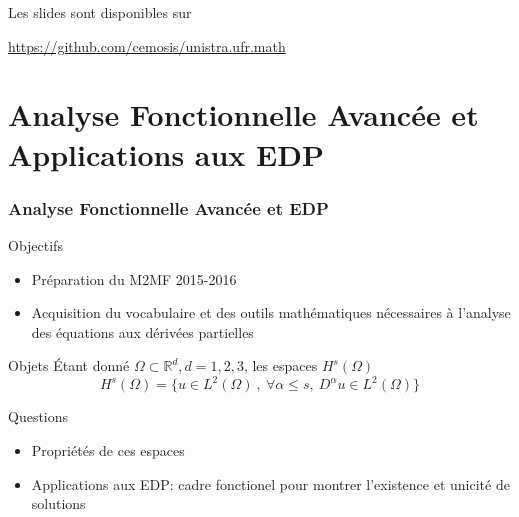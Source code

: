 \documentclass{beamer}
\begin{document}
\begin{frame}
  Les slides sont disponibles sur
  \begin{center}
    \centerline{\url{https://github.com/cemosis/unistra.ufr.math}}
  \end{center}
\end{frame}

\section{Analyse Fonctionnelle Avanc{\'e}e et Applications aux EDP}

\begin{frame}\frametitle{Analyse Fonctionnelle Avancée et  EDP}
  \begin{block}{Objectifs}
    \begin{itemize}
    \item Pr{\'e}paration du M2MF 2015-2016
    \item Acquisition du vocabulaire et des outils math{\'e}matiques n{\'e}cessaires {\`a}
      l'analyse des {\'e}quations aux d{\'e}riv{\'e}es partielles
    \end{itemize}
  \end{block}
  \begin{block}{Objets}
    {\'E}tant donn{\'e} $\Omega \subset \mathbb{R}^d, d=1,2,3$, les espaces $H^s(\Omega)$
    \begin{equation*}
      H^s(\Omega)=\{ u \in L^2(\Omega)~,~\forall\alpha \le s,~D^\alpha u\in L^2(\Omega)\}
    \end{equation*}
  \end{block}
  \begin{block}{Questions}
    \begin{itemize}
    \item Propri{\'e}t{\'e}s de ces espaces
    \item Applications aux EDP: cadre fonctionel pour montrer
      l'existence et unicit{\'e} de solutions
    \end{itemize}
  \end{block}
\end{frame}
\end{document}
